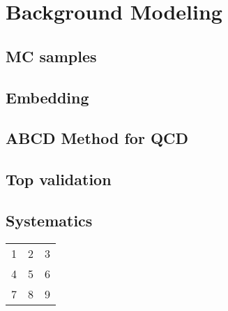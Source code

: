 \section{Background Modeling}

\subsection{MC samples}
\subsection{Embedding}
\subsection{ABCD Method for QCD}
\subsection{Top validation}
\subsection{Systematics}


\begin{table}[htp]
\begin{tabular}{ l c r }
  1 & 2 & 3 \\
  4 & 5 & 6 \\
  7 & 8 & 9 \\
\end{tabular}
\end{table}
